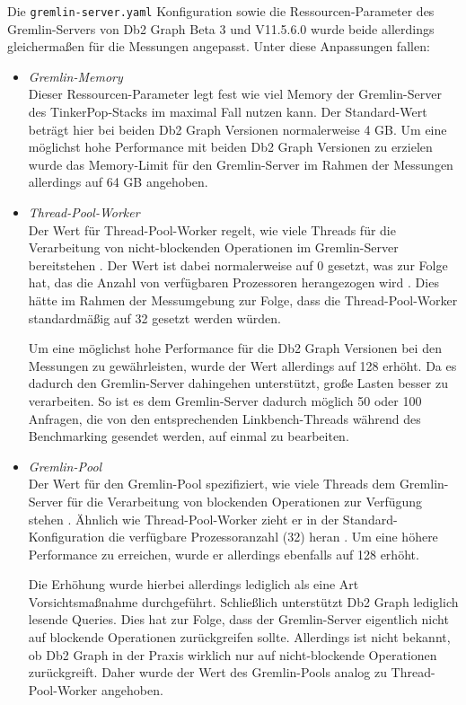 Die \texttt{gremlin-server.yaml} Konfiguration sowie die Ressourcen-Parameter des Gremlin-Servers von Db2 Graph Beta 3 und V11.5.6.0 wurde beide allerdings gleichermaßen für die Messungen angepasst. Unter diese Anpassungen fallen:
\begin{itemize}
    \item \textit{Gremlin-Memory}\\
    Dieser Ressourcen-Parameter legt fest wie viel Memory der Gremlin-Server des TinkerPop-Stacks im maximal Fall nutzen kann. Der Standard-Wert beträgt hier bei beiden Db2 Graph Versionen normalerweise 4 GB. Um eine möglichst hohe Performance mit beiden Db2 Graph Versionen zu erzielen wurde das Memory-Limit für den Gremlin-Server im Rahmen der Messungen allerdings auf 64 GB angehoben. 
    \item \textit{Thread-Pool-Worker}\\
    Der Wert für Thread-Pool-Worker regelt, wie viele Threads für die Verarbeitung von nicht-blockenden Operationen im Gremlin-Server bereitstehen \cite{tinkerpop_2020}. Der Wert ist dabei normalerweise auf 0 gesetzt, was zur Folge hat, das die Anzahl von verfügbaren Prozessoren herangezogen wird \cite{tinkerpop_2020}. Dies hätte im Rahmen der Messumgebung zur Folge, dass die Thread-Pool-Worker standardmäßig auf 32 gesetzt werden würden. 
    
    Um eine möglichst hohe Performance für die Db2 Graph Versionen bei den Messungen zu gewährleisten, wurde der Wert allerdings auf 128 erhöht. Da es dadurch den Gremlin-Server dahingehen unterstützt, große Lasten besser zu verarbeiten. So ist es dem Gremlin-Server dadurch möglich 50 oder 100 Anfragen, die von den entsprechenden Linkbench-Threads während des Benchmarking gesendet werden, auf einmal zu bearbeiten. 
    \item \textit{Gremlin-Pool}\\
    Der Wert für den Gremlin-Pool spezifiziert, wie viele Threads dem Gremlin-Server für die Verarbeitung von blockenden Operationen zur Verfügung stehen \cite{tinkerpop_2020}. Ähnlich wie Thread-Pool-Worker zieht er in der Standard-Konfiguration die verfügbare Prozessoranzahl (32) heran \cite{tinkerpop_2020}. Um eine höhere Performance zu erreichen, wurde er allerdings ebenfalls auf 128 erhöht. 
    
    Die Erhöhung wurde hierbei allerdings lediglich als eine Art Vorsichtsmaßnahme durchgeführt. Schließlich unterstützt Db2 Graph lediglich lesende Queries. Dies hat zur Folge, dass der Gremlin-Server eigentlich nicht auf blockende Operationen zurückgreifen sollte. Allerdings ist nicht bekannt, ob Db2 Graph in der Praxis wirklich nur auf nicht-blockende Operationen zurückgreift. Daher wurde der Wert des Gremlin-Pools analog zu Thread-Pool-Worker angehoben. 
\end{itemize}

